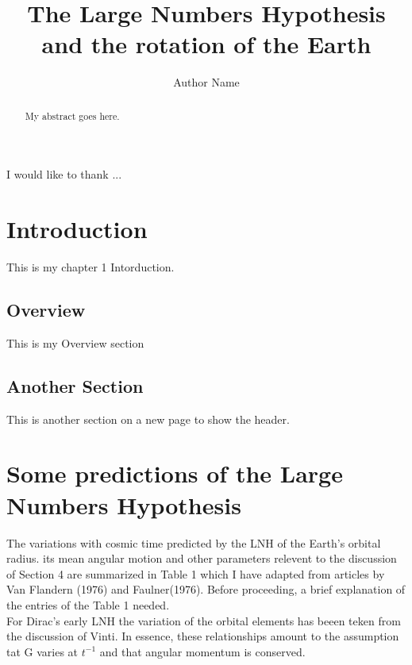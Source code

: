 \documentclass[master, copyright]{resources/class/ms_thesis}
\title{The Large Numbers Hypothesis and the rotation of the Earth}
\author{Author Name}
\begin{document}
\frontmatter  
%




\begin{abstract}      
My abstract goes here.
\end{abstract}





\begin{acknowledgements}
I would like to thank ...
\end{acknowledgements}


\mainmatter


\chapter{Introduction}
This is my chapter 1 Intorduction.
\section{Overview}
This is my Overview section
\newpage
\section{Another Section}
This is another section on a new page to show the header.
\chapter{Some predictions of the Large Numbers Hypothesis}
The variations with cosmic time predicted by the LNH of the Earth's orbital radius. its mean
angular motion  and other parameters relevent to the discussion of Section 4 are summarized in Table 1 which I have adapted from articles by Van Flandern (1976) and Faulner(1976). Before proceeding, a brief explanation of the entries of the Table 1 needed. 
\newline \\
For Dirac's early LNH the variation of the orbital elements has beeen teken from the discussion of Vinti. In essence, these relationships amount to the assumption tat G varies at $t^{-1}$ and that angular momentum is conserved. 
\end{document}
